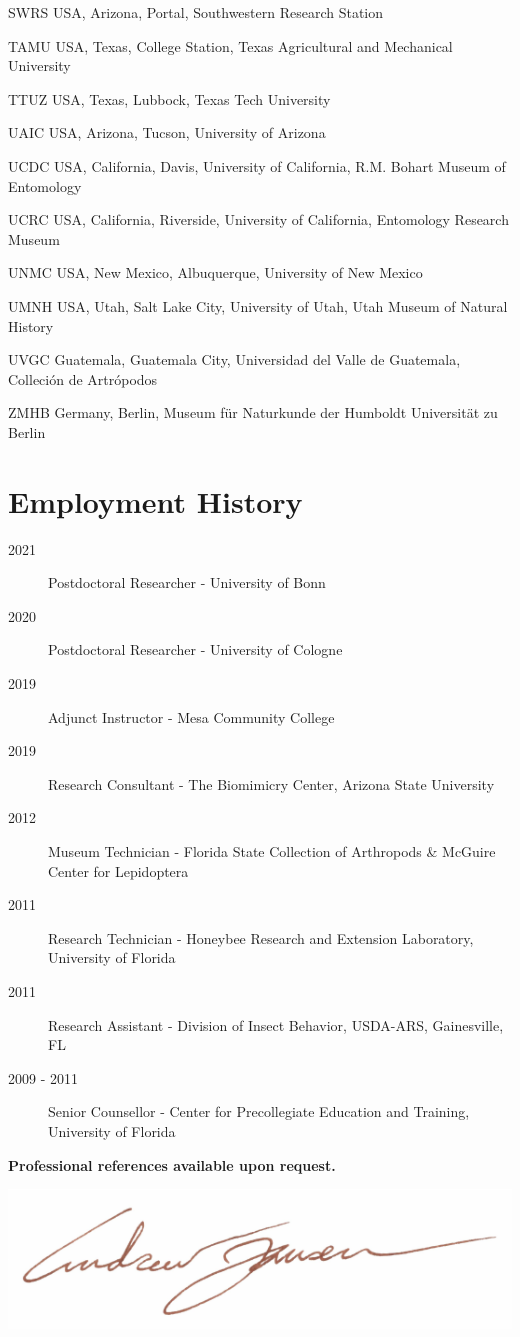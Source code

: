 \documentclass[12pt,a4paper]{article}
\begin{document}
\begin{collections}
			\item [SWRS] USA, Arizona, Portal, Southwestern Research Station
			\item [TAMU] USA, Texas, College Station, Texas Agricultural and Mechanical University
			\item [TTUZ] USA, Texas, Lubbock, Texas Tech University
			\item [UAIC] USA, Arizona, Tucson, University of Arizona
			\item [UCDC] USA, California, Davis, University of California, R.M. Bohart Museum of Entomology
			\item [UCRC] USA, California, Riverside, University of California, Entomology Research Museum
			\item [UNMC] USA, New Mexico, Albuquerque, University of New Mexico
			\item [UMNH] USA, Utah, Salt Lake City, University of Utah, Utah Museum of Natural History
			\item [UVGC] Guatemala, Guatemala City, Universidad del Valle de Guatemala, Colleci\'{o}n de Artr\'{o}podos
			\item [ZMHB] Germany, Berlin, Museum f\"{u}r Naturkunde der Humboldt Universit\"{a}t zu Berlin
		\end{collections}

\section*{Employment History}
	\begin{description}
		\item [2021] Postdoctoral Researcher - University of Bonn
		\item [2020] Postdoctoral Researcher - University of Cologne
		\item [2019] Adjunct Instructor - Mesa Community College
		\item [2019] Research Consultant - The Biomimicry Center, Arizona State University
		\item [2012] Museum Technician - Florida State Collection of Arthropods \& McGuire Center for Lepidoptera
		\item [2011] Research Technician - Honeybee Research and Extension Laboratory, University of Florida
		\item [2011] Research Assistant - Division of Insect Behavior, USDA-ARS, Gainesville, FL
		\item [2009 - 2011] Senior Counsellor - Center for Precollegiate Education and Training, University of Florida
	\end{description}

\vspace{1cm}

\noindent\large{\textbf{Professional references available upon request.}}

\vspace*{1cm}
\includegraphics[scale=1]{signature.pdf}\\
\end{document}
